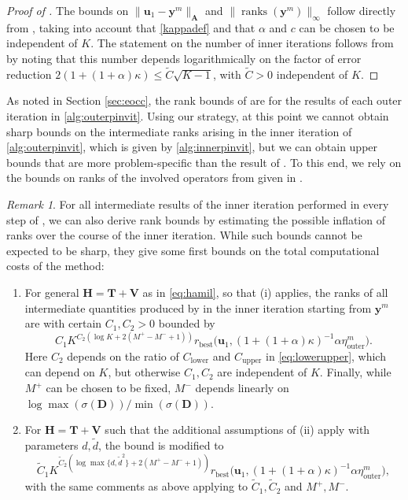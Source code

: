 \documentclass[a4paper,11pt,oneside]{amsart}
\DeclareMathOperator{\ranks}{ranks}
\providecommand{\norm}[1]{\lVert#1\rVert}
\theoremstyle{definition}
\theoremstyle{remark}
\newtheorem{remark}[theorem]{Remark}
\newcommand{\A}{\ten A}
\newcommand{\ten}[1]{\boldsymbol{#1}}
\newcommand{\etaout}{\eta_{\mathrm{outer}}}
\numberwithin{equation}{section}
\numberwithin{theorem}{section}
\begin{document}
\begin{proof}[Proof of ]
The bounds on $ \|\ten{u}_1 - \ten y^m\|_{\A}$ and $\norm{\ranks(\ten y^m)}_\infty$ follow directly from , taking into account that \eqref{kappadef} and that $\alpha$ and $c$ can be chosen to be independent of $K$. The statement on the number of inner iterations follows from  by noting that this number depends logarithmically on the factor of error reduction $2(1 + (1+\alpha)\kappa) \leq \tilde C \sqrt{K-1}$, with $\tilde C>0$ independent of $K$.
\end{proof}


As noted in Section \ref{sec:eocc}, the rank bounds of  are for the results of each outer iteration in \cref{alg:outerpinvit}.
Using our strategy, at this point we cannot obtain sharp bounds on the intermediate ranks arising in the inner iteration of \cref{alg:outerpinvit}, which is given by \cref{alg:innerpinvit}, but we can obtain upper bounds that  are more problem-specific than the result of .
To this end, we rely on the bounds on ranks of the involved operators from \cite{BGP:22} given in . 

\begin{remark}\label{rem:intermediateranks}
For all intermediate results of the inner iteration  performed in every step of , we can also derive rank bounds by estimating the possible inflation of ranks over the course of the inner iteration. While such bounds cannot be expected to be sharp, they give some first bounds on the total computational costs of the method:
\begin{enumerate}[{\rm\bf(i)}]
\item For general $\ten H = \ten T + \ten V$ as in \cref{eq:hamil}, so that (i) applies, the ranks of all intermediate quantities produced by  in the inner iteration starting from $\ten y^m$ are with certain $C_1, C_2>0$ bounded by 
\[ C_1  K^{C_2 ( \log K + 2 (M^+ - M^- + 1) ) } r_{\mathrm{best}}\bigl(\ten{u}_1, (1+(1+\alpha)\kappa)^{-1} \alpha \etaout^m \bigr). \]
 Here $C_2$ depends on the ratio of $C_{\mathrm{lower}}$ and $C_{\mathrm{upper}}$ in \eqref{eq:lowerupper}, which can depend on $K$, but otherwise $C_1, C_2$ are independent of $K$. Finally, while $M^+$ can be chosen to be fixed, $M^-$ depends linearly on $\log \max(\sigma(\ten D)) /  \min(\sigma(\ten D))$.

\item For $\ten H = \ten T + \ten V$ such that the additional assumptions of (ii) apply with parameters $d, \tilde d$, the bound is modified to 
\[
\tilde C_1  K^{\tilde C_2 ( \log \max\{ d, \tilde{ d}^2\} + 2 (M^+ - M^- + 1) )  } r_{\mathrm{best}}\bigl(\ten{u}_1, (1+(1+\alpha)\kappa)^{-1} \alpha \etaout^m \bigr),
\]
with the same comments as above applying to $\tilde C_1, \tilde C_2$ and $M^+, M^-$.
\end{enumerate}
\end{remark}
\end{document}
